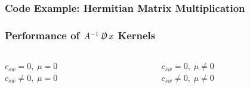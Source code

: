\documentclass{beamer}
\begin{document}
  \begin{frame}[fragile]
    \frametitle{Code Example: Hermitian Matrix Multiplication}
    \small

    
\end{frame}


  \begin{frame}
    \frametitle{Performance of $A^{-1} \, \slashed D \, x $ Kernels}
    \vspace{-5mm}
    \footnotesize

    \begin{columns}[T]
      \begin{column}{.5\textwidth}
        \begin{center}
          $c_{sw} = 0, \; \mu = 0$ \\
          \vfill
          $c_{sw} \neq 0, \; \mu = 0$ \\
          \vfill
        \end{center}
      \end{column}
      \begin{column}{.5\textwidth}
        \begin{center}
          $c_{sw} = 0, \; \mu \neq 0$ \\
          \vfill
          $c_{sw} \neq 0, \; \mu \neq 0$ \\
          \vfill
        \end{center}
      \end{column}
    \end{columns}

  \end{frame}

\end{document}
